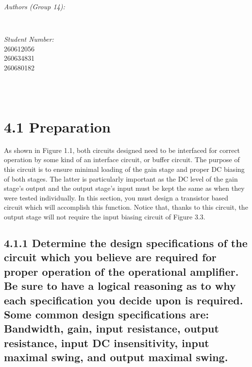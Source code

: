 \documentclass[12pt]{article}
\makeatletter
\let\theauthor\@author
\let\thedate\@date
\makeatother
\begin{document}
\begin{titlepage}
\begin{minipage}{0.4\textwidth}
\begin{flushleft}
            \emph{Authors (Group 14):}\\
            \theauthor
            \end{flushleft}
            \end{minipage}~
            \begin{minipage}{0.4\textwidth}
            \begin{flushright} \large
            \emph{Student Number:} \\
            260612056 \\ 260634831 \\ 260680182                                  %
        \end{flushright}
    \end{minipage}\\[2 cm]
 
    {\large \thedate}\\[2 cm]
 
    \vfill
    
\end{titlepage}


\section*{4.1 Preparation}

As shown in Figure 1.1, both circuits designed need to be interfaced for correct operation 
by some kind of an interface circuit, or buffer circuit. The purpose of this circuit is to 
ensure minimal loading of the gain stage and proper DC biasing of both stages. The latter 
is particularly important as the DC level of the gain stage’s output and the output stage’s 
input must be kept the same as when they were tested individually. In this section, you 
must design a transistor based circuit which will accomplish this function. Notice that, 
thanks to this circuit, the output stage will not require the input biasing circuit of Figure 3.3.          

\subsection*{4.1.1 Determine the design specifications of the circuit which you 
believe are required for proper operation of the operational amplifier. 
Be sure to have a logical reasoning as to why each specification you decide 
upon is required. Some common design specifications are: Bandwidth, gain, 
input resistance, output resistance, input DC insensitivity, input maximal 
swing, and output maximal swing. }
\end{document}
